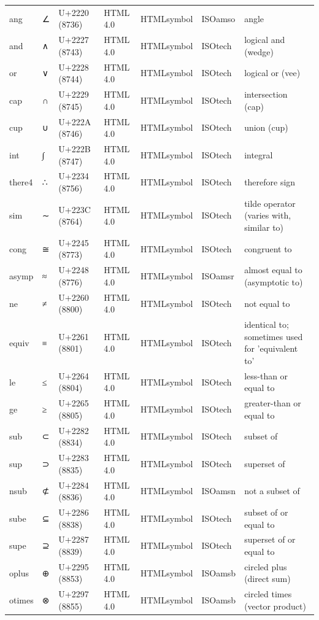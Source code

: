 \documentclass{article}
\begin{document}
\begin{tabular}{lllllll}
ang & ∠ & U+2220 (8736) & HTML 4.0 & HTMLsymbol & ISOamso & angle \\
and & ∧ & U+2227 (8743) & HTML 4.0 & HTMLsymbol & ISOtech & logical and (wedge) \\
or & ∨ & U+2228 (8744) & HTML 4.0 & HTMLsymbol & ISOtech & logical or (vee) \\
cap & ∩ & U+2229 (8745) & HTML 4.0 & HTMLsymbol & ISOtech & intersection (cap) \\
cup & ∪ & U+222A (8746) & HTML 4.0 & HTMLsymbol & ISOtech & union (cup) \\
int & ∫ & U+222B (8747) & HTML 4.0 & HTMLsymbol & ISOtech & integral \\
there4 & ∴ & U+2234 (8756) & HTML 4.0 & HTMLsymbol & ISOtech & therefore sign \\
sim & ∼ & U+223C (8764) & HTML 4.0 & HTMLsymbol & ISOtech & tilde operator (varies with, similar to) \\
cong & ≅ & U+2245 (8773) & HTML 4.0 & HTMLsymbol & ISOtech & congruent to \\
asymp & ≈ & U+2248 (8776) & HTML 4.0 & HTMLsymbol & ISOamsr & almost equal to (asymptotic to) \\
ne & ≠ & U+2260 (8800) & HTML 4.0 & HTMLsymbol & ISOtech & not equal to \\
equiv & ≡ & U+2261 (8801) & HTML 4.0 & HTMLsymbol & ISOtech & identical to; sometimes used for 'equivalent to' \\
le & ≤ & U+2264 (8804) & HTML 4.0 & HTMLsymbol & ISOtech & less-than or equal to \\
ge & ≥ & U+2265 (8805) & HTML 4.0 & HTMLsymbol & ISOtech & greater-than or equal to \\
sub & ⊂ & U+2282 (8834) & HTML 4.0 & HTMLsymbol & ISOtech & subset of \\
sup & ⊃ & U+2283 (8835) & HTML 4.0 & HTMLsymbol & ISOtech & superset of \\
nsub & ⊄ & U+2284 (8836) & HTML 4.0 & HTMLsymbol & ISOamsn & not a subset of \\
sube & ⊆ & U+2286 (8838) & HTML 4.0 & HTMLsymbol & ISOtech & subset of or equal to \\
supe & ⊇ & U+2287 (8839) & HTML 4.0 & HTMLsymbol & ISOtech & superset of or equal to \\
oplus & ⊕ & U+2295 (8853) & HTML 4.0 & HTMLsymbol & ISOamsb & circled plus (direct sum) \\
otimes & ⊗ & U+2297 (8855) & HTML 4.0 & HTMLsymbol & ISOamsb & circled times (vector product) \\

\end{tabular}
\end{document}
